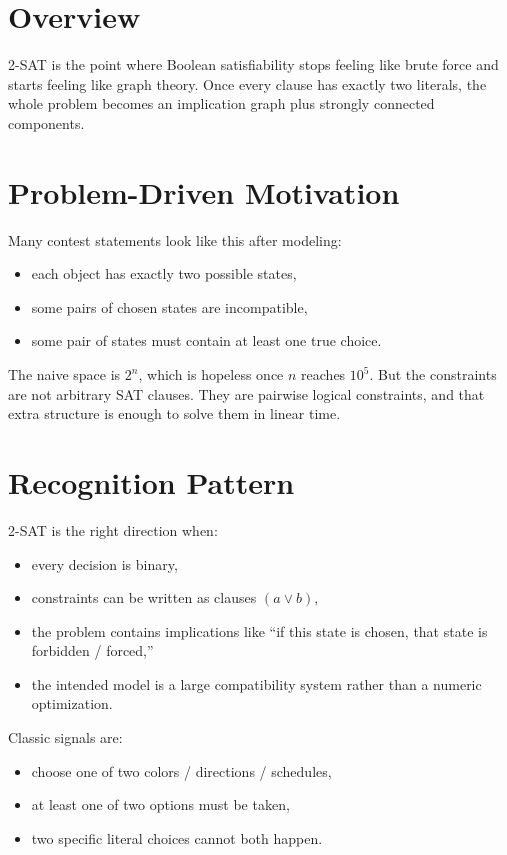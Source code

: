 \section*{Overview}

2-SAT is the point where Boolean satisfiability stops feeling like brute force and starts feeling like graph theory.
Once every clause has exactly two literals, the whole problem becomes an implication graph plus strongly connected
components.

\section*{Problem-Driven Motivation}

Many contest statements look like this after modeling:

\begin{itemize}
  \item each object has exactly two possible states,
  \item some pairs of chosen states are incompatible,
  \item some pair of states must contain at least one true choice.
\end{itemize}

The naive space is \(2^n\), which is hopeless once \(n\) reaches \(10^5\). But the constraints are not arbitrary SAT
clauses. They are pairwise logical constraints, and that extra structure is enough to solve them in linear time.

\section*{Recognition Pattern}

2-SAT is the right direction when:

\begin{itemize}
  \item every decision is binary,
  \item constraints can be written as clauses \((a \lor b)\),
  \item the problem contains implications like ``if this state is chosen, that state is forbidden / forced,''
  \item the intended model is a large compatibility system rather than a numeric optimization.
\end{itemize}

Classic signals are:

\begin{itemize}
  \item choose one of two colors / directions / schedules,
  \item at least one of two options must be taken,
  \item two specific literal choices cannot both happen.
\end{itemize}


